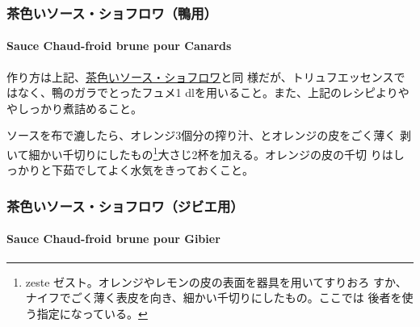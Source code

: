 \begin{recette}
\hypertarget{ux8336ux8272ux3044ux30bdux30fcux30b9ux30b7ux30e7ux30d5ux30edux30efux9d28ux7528}{%
\subsubsection{茶色いソース・ショフロワ（鴨用）}\label{ux8336ux8272ux3044ux30bdux30fcux30b9ux30b7ux30e7ux30d5ux30edux30efux9d28ux7528}}

\hypertarget{sauce-chaud-froid-brune-pour-canards}{%
\paragraph{Sauce Chaud-froid brune pour
Canards}\label{sauce-chaud-froid-brune-pour-canards}}

  

作り方は上記、\protect\hyperlink{sauce-chaud-froid-brune}{茶色いソース・ショフロワ}と同
様だが、トリュフエッセンスではなく、鴨のガラでとったフュメ1\undemi{}
dlを用いること。また、上記のレシピよりややしっかり煮詰めること。

ソースを布で漉したら、オレンジ3個分の搾り汁、とオレンジの皮をごく薄く
剥いて細かい千切りにしたもの\footnote{zeste
  ゼスト。オレンジやレモンの皮の表面を器具を用いてすりおろ
  すか、ナイフでごく薄く表皮を向き、細かい千切りにしたもの。ここでは
  後者を使う指定になっている。}大さじ2杯を加える。オレンジの皮の千切
りはしっかりと下茹でしてよく水気をきっておくこと。

\maeaki

\hypertarget{ux8336ux8272ux3044ux30bdux30fcux30b9ux30b7ux30e7ux30d5ux30edux30efux30b8ux30d3ux30a8ux7528}{%
\subsubsection{茶色いソース・ショフロワ（ジビエ用）}\label{ux8336ux8272ux3044ux30bdux30fcux30b9ux30b7ux30e7ux30d5ux30edux30efux30b8ux30d3ux30a8ux7528}}

\hypertarget{sauce-chaud-froid-brune-pour-gibier}{%
\paragraph{Sauce Chaud-froid brune pour
Gibier}\label{sauce-chaud-froid-brune-pour-gibier}}


\end{recette}
